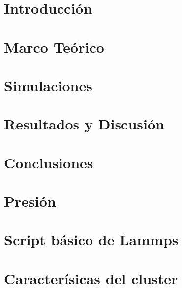 \documentclass[a4paper,12pt]{report}
\begin{document}
 


%
\tableofcontents
\chapter{Introducción}

\chapter{Marco Teórico}
 
\chapter{Simulaciones}

\chapter{Resultados y Discusión}

\chapter{Conclusiones}

\begin{appendices}
\chapter{Presión}

\chapter{Script básico de Lammps}

\chapter{Caracterísicas del cluster}

\end{appendices}

\end{document}
